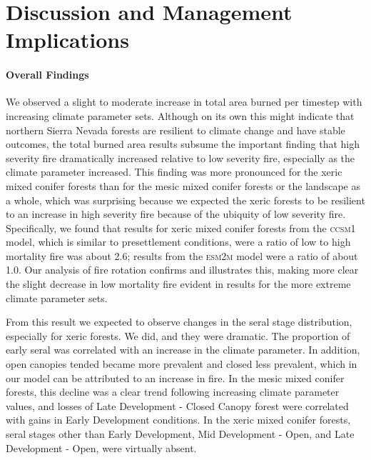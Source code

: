 \section{Discussion and Management Implications}

\paragraph{Overall Findings}
We observed a slight to moderate increase in total area burned per timestep with increasing climate parameter sets. Although on its own this might indicate that northern Sierra Nevada forests are resilient to climate change and have stable outcomes, the total burned area results subsume the important finding that high severity fire dramatically increased relative to low severity fire, especially as the climate parameter increased. This finding was more pronounced for the xeric mixed conifer forests than for the mesic mixed conifer forests or the landscape as a whole, which was surprising because we expected the xeric forests to be resilient to an increase in high severity fire because of the ubiquity of low severity fire. Specifically, we found that results for xeric mixed conifer forests from the \textsc{ccsm1} model, which is similar to presettlement conditions, were a ratio of low to high mortality fire was about 2.6; results from the \textsc{esm2m} model were a ratio of about 1.0. Our analysis of fire rotation confirms and illustrates this, making more clear the slight decrease in low mortality fire evident in results for the more extreme climate parameter sets.

From this result we expected to observe changes in the seral stage distribution, especially for xeric forests. We did, and they were dramatic. The proportion of early seral was correlated with an increase in the climate parameter. In addition, open canopies tended became more prevalent and closed less prevalent, which in our model can be attributed to an increase in fire. In the mesic mixed conifer forests, this decline was a clear trend following increasing climate parameter values, and losses of Late Development - Closed Canopy forest were  correlated with gains in Early Development conditions. In the xeric mixed conifer forests, seral stages other than Early Development, Mid Development - Open, and Late Development - Open, were virtually absent.

